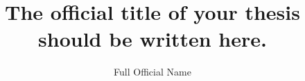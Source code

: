 
\title{The official title of your thesis should be written here.}

\author{Full Official Name}

\makecoverpage